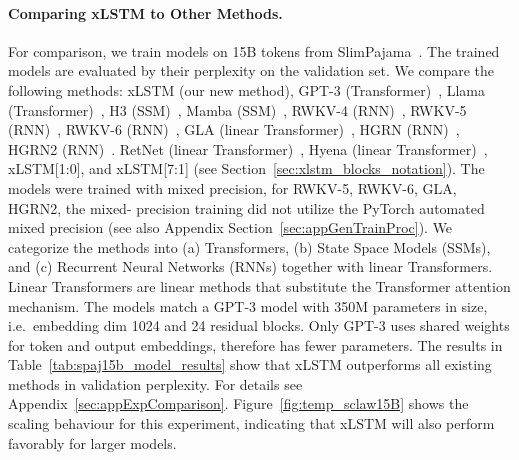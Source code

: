 \documentclass[dvipsnames]{article}
\begin{document}
\paragraph{Comparing xLSTM to Other Methods.}
For comparison, we train models on 15B tokens from SlimPajama~\citep{Soboleva:23}.
The trained models are evaluated 
by their perplexity on the validation set. 
We compare the following methods:
xLSTM (our new method),
GPT-3 (Transformer)~\citep{Brown:20short}, 
Llama (Transformer)~\citep{Touvron:23arxiv},
H3 (SSM)~\citep{Fu:23}, 
Mamba (SSM)~\citep{Gu:24arxiv},
RWKV-4 (RNN)~\citep{Peng:23arxivshort}, 
RWKV-5 (RNN)~\citep{Peng:24arxivshort}, 
RWKV-6 (RNN)~\citep{Peng:24arxivshort}, 
GLA (linear Transformer)~\citep{Yang:23arxiv}, 
HGRN (RNN)~\citep{Qin:23},
HGRN2 (RNN)~\citep{Qin:24arxiv}. 
RetNet (linear Transformer)~\citep{Sun:23arxiv}, 
Hyena (linear Transformer)~\citep{Poli:23},
xLSTM[1:0], and
xLSTM[7:1] (see Section~\ref{sec:xlstm_blocks_notation}). 
The models were trained with mixed precision, 
for RWKV-5, RWKV-6, GLA, HGRN2, the mixed-
precision training did not utilize the PyTorch automated mixed precision (see also Appendix Section~\ref{sec:appGenTrainProc}).
We categorize the methods into (a) Transformers, 
(b) State Space Models (SSMs), and
(c) Recurrent Neural Networks (RNNs) together with linear Transformers. 
Linear Transformers are linear methods that substitute the Transformer attention mechanism.
The models match a GPT-3 model with 350M parameters in size,
i.e.\ embedding dim 1024 and 24 residual blocks. 
Only GPT-3 uses shared weights for token and output embeddings,
therefore has fewer parameters.
The results in Table~\ref{tab:spaj15b_model_results} show that xLSTM
outperforms all existing methods in validation perplexity.
For details see Appendix~\ref{sec:appExpComparison}.
Figure~\ref{fig:temp_sclaw15B} shows the scaling behaviour
for this experiment, indicating that xLSTM will 
also perform favorably for larger models.
\end{document}
